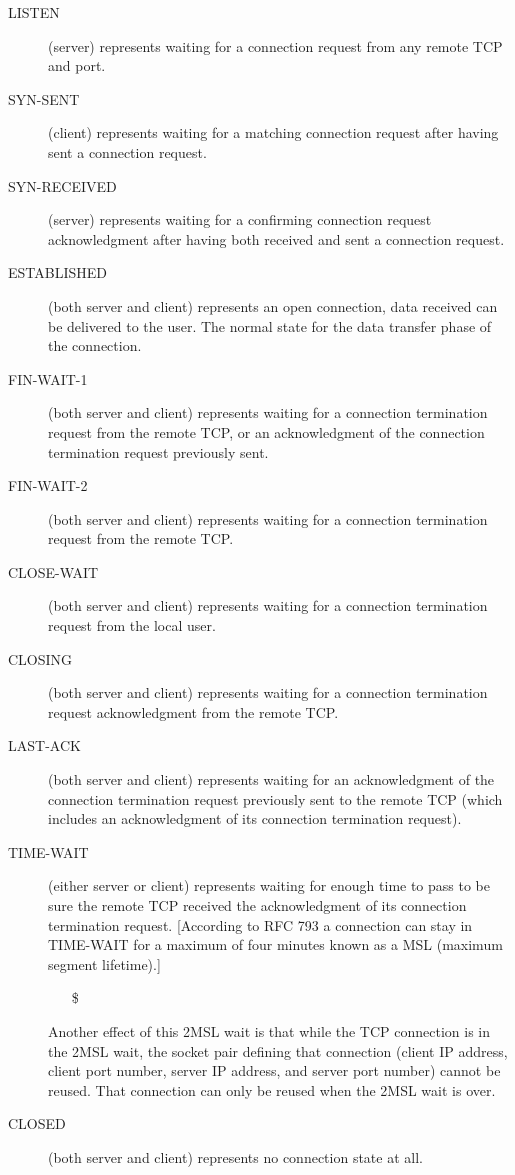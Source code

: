 \begin{description}
\item[LISTEN] (server) represents waiting for a connection request from any remote TCP and
  port.
\item[SYN-SENT] (client) represents waiting for a matching connection request after having
  sent a connection request.
\item[SYN-RECEIVED] (server) represents waiting for a confirming connection request
  acknowledgment after having both received and sent a connection request.
\item[ESTABLISHED] (both server and client) represents an open connection, data received
  can be delivered to the user. The normal state for the data transfer phase of the
  connection.
\item[FIN-WAIT-1] (both server and client) represents waiting for a connection termination
  request from the remote TCP, or an acknowledgment of the connection termination request
  previously sent.
\item[FIN-WAIT-2] (both server and client) represents waiting for a connection termination
  request from the remote TCP.
\item[CLOSE-WAIT] (both server and client) represents waiting for a connection termination
  request from the local user.
\item[CLOSING] (both server and client) represents waiting for a connection termination
  request acknowledgment from the remote TCP.
\item[LAST-ACK] (both server and client) represents waiting for an acknowledgment of the
  connection termination request previously sent to the remote TCP (which includes an
  acknowledgment of its connection termination request).
\item[TIME-WAIT] (either server or client) represents waiting for enough time to pass to
  be sure the remote TCP received the acknowledgment of its connection termination
  request. [According to RFC 793 a connection can stay in TIME-WAIT for a maximum of four
  minutes known as a MSL (maximum segment lifetime).]
  \begin{itemize}
  \item[\$] 
  \end{itemize}
  Another effect of this 2MSL wait is that while the TCP connection is in the 2MSL wait,
  the socket pair defining that connection (client IP address, client port number, server
  IP address, and server port number) cannot be reused. That connection can only be reused
  when the 2MSL wait is over.  
\item[CLOSED] (both server and client) represents no connection state at all.
\end{description}

